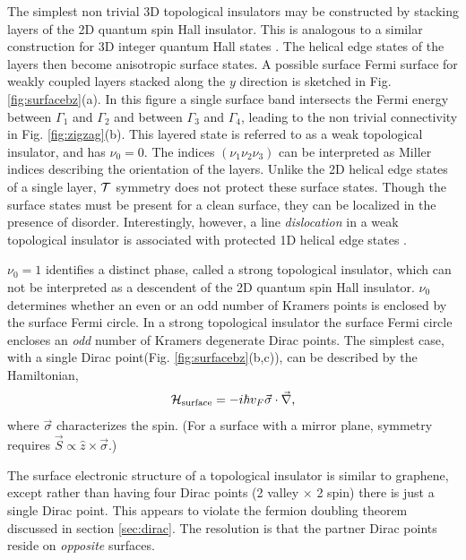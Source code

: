 \documentclass[twocolumn,floatfix,showpacs,rmp,aps]{revtex4}
\begin{document}
The simplest non trivial 3D topological insulators may be
constructed by stacking layers of the 2D quantum spin Hall
insulator.  This is analogous to a similar construction for 3D
integer quantum Hall states \cite{kohmoto92}.
The helical edge states of the layers
then become anisotropic surface states.
A possible surface Fermi surface for weakly coupled layers stacked along the
$y$ direction is sketched in Fig. \ref{fig:surfacebz}(a).  In this figure a single
surface band intersects the Fermi energy between $\Gamma_1$ and $\Gamma_2$ and
between $\Gamma_3$ and $\Gamma_4$, leading to the non trivial connectivity in
Fig. \ref{fig:zigzag}(b).  This layered state is referred to as a weak topological
insulator, and has $\nu_0=0$.
The indices $(\nu_1\nu_2\nu_3)$ can be interpreted as Miller indices
describing the orientation of the layers.
Unlike the 2D helical edge states of a single layer, ${\cal T}$
symmetry does not protect these surface states.  Though the
surface states must be present for a clean surface, they
can be localized in the presence of disorder.
Interestingly, however, a line {\it dislocation} in
a weak topological insulator is associated with protected 1D
helical edge states \cite{ran09}.

$\nu_0=1$ identifies a distinct phase, called a strong topological insulator,
which can not be interpreted as a
descendent of the 2D quantum spin Hall insulator.  $\nu_0$ determines
whether an even or an odd number
of Kramers points is enclosed by the surface Fermi circle.
In a strong topological insulator the surface Fermi circle encloses an {\it odd} number of
Kramers degenerate Dirac points.    The simplest case, with a single Dirac
point(Fig. \ref{fig:surfacebz}(b,c)), can be described by the Hamiltonian,
\begin{equation}
{\cal H}_{\rm surface} = -i\hbar v_F \vec\sigma\cdot\vec\nabla,
\label{surfacedirac}
\end{equation}
where $\vec\sigma$ characterizes the spin.  (For a surface with a mirror plane,
symmetry requires $\vec S \propto \hat z\times\vec\sigma$.)

The surface electronic structure of a topological insulator is
similar to graphene, except rather than having four
Dirac points (2 valley $\times$ 2 spin) there is just a single Dirac
point.  This appears to violate the fermion doubling theorem \cite{nielssen83}
discussed in section \ref{sec:dirac}.  The resolution is that the partner
Dirac points reside on {\it opposite} surfaces.
\end{document}
